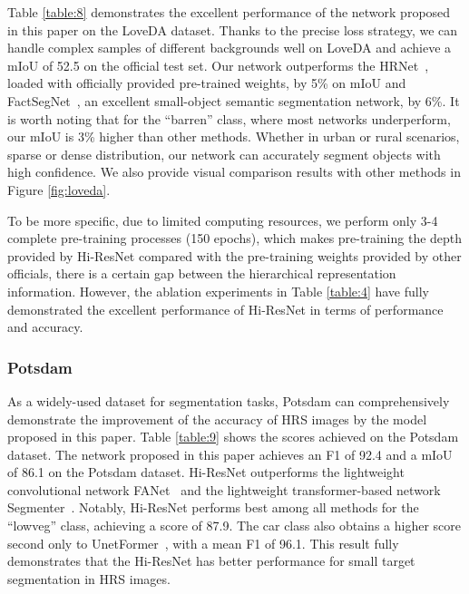 \documentclass[journal]{IEEEtran}
\begin{document}
Table \ref{table:8} demonstrates the excellent performance of the network proposed in this paper on the LoveDA dataset. Thanks to the precise loss strategy, we can handle complex samples of different backgrounds well on LoveDA and achieve a mIoU of 52.5 on the official test set. Our network outperforms the HRNet~\cite{wang2020deep}, loaded with officially provided pre-trained weights, by 5\% on mIoU and FactSegNet~\cite{ma2021factseg}, an excellent small-object semantic segmentation network, by 6\%. It is worth noting that for the ``barren'' class, where most networks underperform, our mIoU is 3\% higher than other methods. Whether in urban or rural scenarios, sparse or dense distribution, our network can accurately segment objects with high confidence. We also provide visual comparison results with other methods in Figure \ref{fig:loveda}.

To be more specific, due to limited computing resources, we perform only 3-4 complete pre-training processes (150 epochs), which makes pre-training the depth provided by Hi-ResNet compared with the pre-training weights provided by other officials, there is a certain gap between the hierarchical representation information. However, the ablation experiments in Table \ref{table:4} have fully demonstrated the excellent performance of Hi-ResNet in terms of performance and accuracy.


\subsubsection{Potsdam}
As a widely-used dataset for segmentation tasks, Potsdam can comprehensively demonstrate the improvement of the accuracy of HRS images by the model proposed in this paper. Table \ref{table:9} shows the scores achieved on the Potsdam dataset. The network proposed in this paper achieves an F1 of 92.4 and a mIoU of 86.1 on the Potsdam dataset. Hi-ResNet outperforms the lightweight convolutional network FANet~\cite{hu2020real} and the lightweight transformer-based network Segmenter~\cite{strudel2021segmenter}. Notably, Hi-ResNet performs best among all methods for the ``lowveg''
 class, achieving a score of 87.9. The car class also obtains a higher score second only to UnetFormer~\cite{wang2022unetformer}, with a mean F1 of 96.1. This result fully demonstrates that the Hi-ResNet has better performance for small target segmentation in HRS images.
\end{document}
